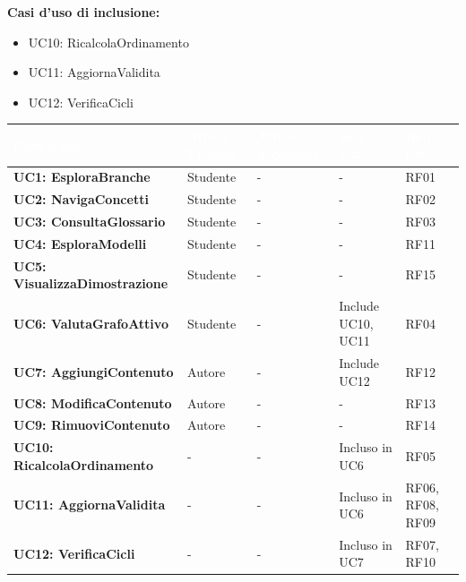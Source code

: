 \documentclass[12pt,a4paper]{article}
\begin{document}
\textbf{Casi d'uso di inclusione:}
\begin{itemize}
    \item UC10: RicalcolaOrdinamento
    \item UC11: AggiornaValidita
    \item UC12: VerificaCicli
\end{itemize}

\begin{table}[H]
    \centering
    \small
    \begin{tabularx}{\textwidth}{|p{3.5cm}|X|X|p{4cm}|p{1.5cm}|}
        \hline
        \rowcolor{PrimaryBlue} \textcolor{white}{\textbf{Caso d'uso}} & \textcolor{white}{\textbf{Attori Primari}} & \textcolor{white}{\textbf{Attori Secondari}} & \textcolor{white}{\textbf{Incl. / Ext.}} & \textcolor{white}{\textbf{Req. corr.}} \\
        \hline
        \textbf{UC1: EsploraBranche} & Studente & - & - & RF01 \\
        \hline
        \rowcolor{CodeBg} \textbf{UC2: NavigaConcetti} & Studente & - & - & RF02 \\
        \hline
        \textbf{UC3: ConsultaGlossario} & Studente & - & - & RF03 \\
        \hline
        \rowcolor{CodeBg} \textbf{UC4: EsploraModelli} & Studente & - & - & RF11 \\
        \hline
        \textbf{UC5: VisualizzaDimostrazione} & Studente & - & - & RF15 \\
        \hline
        \rowcolor{CodeBg} \textbf{UC6: ValutaGrafoAttivo} & Studente & - & Include UC10, UC11 & RF04 \\
        \hline
        \textbf{UC7: AggiungiContenuto} & Autore & - & Include UC12 & RF12 \\
        \hline
        \rowcolor{CodeBg} \textbf{UC8: ModificaContenuto} & Autore & - & - & RF13 \\
        \hline
        \textbf{UC9: RimuoviContenuto} & Autore & - & - & RF14 \\
        \hline
        \rowcolor{CodeBg} \textbf{UC10: RicalcolaOrdinamento}& - & - & Incluso in UC6 & RF05 \\
        \hline
        \textbf{UC11: AggiornaValidita} & - & - & Incluso in UC6 & RF06, RF08, RF09 \\
        \hline
        \rowcolor{CodeBg} \textbf{UC12: VerificaCicli} & - & - & Incluso in UC7 & RF07, RF10 \\
        \hline
    \end{tabularx}
\end{table}
\end{document}
